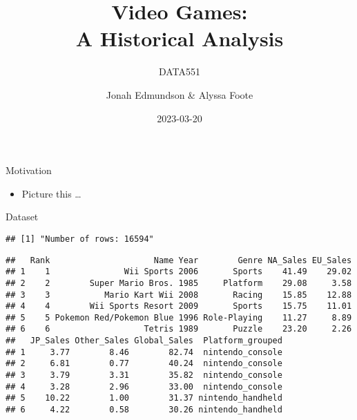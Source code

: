 \documentclass[
  11pt,
  ignorenonframetext,
]{beamer}
\title{Video Games:\\
A Historical Analysis}
\subtitle{DATA551}
\author{Jonah Edmundson \& Alyssa Foote}
\date{2023-03-20}
\providecommand{\tightlist}{%
  \setlength{\itemsep}{0pt}\setlength{\parskip}{0pt}}
\begin{document}
\frame{\titlepage}

\begin{frame}{Motivation}
\protect\hypertarget{motivation}{}
\begin{itemize}
\tightlist
\item
  Picture this \ldots{}
\end{itemize}
\end{frame}

\begin{frame}[fragile]{Dataset}
\protect\hypertarget{dataset}{}
\footnotesize

\begin{verbatim}
## [1] "Number of rows: 16594"
\end{verbatim}

\begin{verbatim}
##   Rank                     Name Year        Genre NA_Sales EU_Sales
## 1    1               Wii Sports 2006       Sports    41.49    29.02
## 2    2        Super Mario Bros. 1985     Platform    29.08     3.58
## 3    3           Mario Kart Wii 2008       Racing    15.85    12.88
## 4    4        Wii Sports Resort 2009       Sports    15.75    11.01
## 5    5 Pokemon Red/Pokemon Blue 1996 Role-Playing    11.27     8.89
## 6    6                   Tetris 1989       Puzzle    23.20     2.26
##   JP_Sales Other_Sales Global_Sales  Platform_grouped
## 1     3.77        8.46        82.74  nintendo_console
## 2     6.81        0.77        40.24  nintendo_console
## 3     3.79        3.31        35.82  nintendo_console
## 4     3.28        2.96        33.00  nintendo_console
## 5    10.22        1.00        31.37 nintendo_handheld
## 6     4.22        0.58        30.26 nintendo_handheld
\end{verbatim}
\end{frame}
\end{document}
